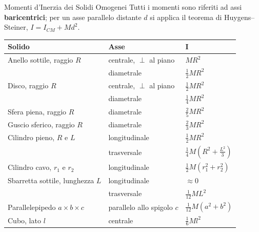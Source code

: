 \begin{formulario}{Momenti d'Inerzia dei Solidi Omogenei}
Tutti i momenti sono riferiti ad assi \textbf{baricentrici}; per un asse parallelo distante $d$ si applica
il teorema di Huygens--Steiner, $I = I_{CM} + Md^2$.

\vspace{4pt}
\centering
\renewcommand{\arraystretch}{1.45}
\begin{tabular}{@{}l l l@{}}
\toprule
\textbf{Solido} & \textbf{Asse} & $\boldsymbol{I}$ \\
\midrule
Anello sottile, raggio $R$      & centrale, $\perp$ al piano   & $M R^2$ \\
                                & diametrale                   & $\tfrac{1}{2} M R^2$ \\
\midrule
Disco, raggio $R$               & centrale, $\perp$ al piano   & $\tfrac{1}{2} M R^2$ \\
                                & diametrale                   & $\tfrac{1}{4} M R^2$ \\
\midrule
Sfera piena, raggio $R$         & diametrale                   & $\tfrac{2}{5} M R^2$ \\
Guscio sferico, raggio $R$      & diametrale                   & $\tfrac{2}{3} M R^2$ \\
\midrule
Cilindro pieno, $R$ e $L$       & longitudinale                & $\tfrac{1}{2} M R^2$ \\
                                & trasversale                  & $\tfrac{1}{4} M \left( R^2 + \tfrac{L^2}{3} \right)$ \\
Cilindro cavo, $r_1$ e $r_2$    & longitudinale                & $\tfrac{1}{2} M (r_1^2 + r_2^2)$ \\
\midrule
Sbarretta sottile, lunghezza $L$ & longitudinale               & $\approx 0$ \\
                                 & trasversale                 & $\tfrac{1}{12} M L^2$ \\
\midrule
Parallelepipedo $a \times b \times c$ & parallelo allo spigolo $c$ & $\tfrac{1}{12} M (a^2 + b^2)$ \\
Cubo, lato $l$                  & centrale                     & $\tfrac{1}{6} M l^2$ \\
\bottomrule
\end{tabular}
\end{formulario}

